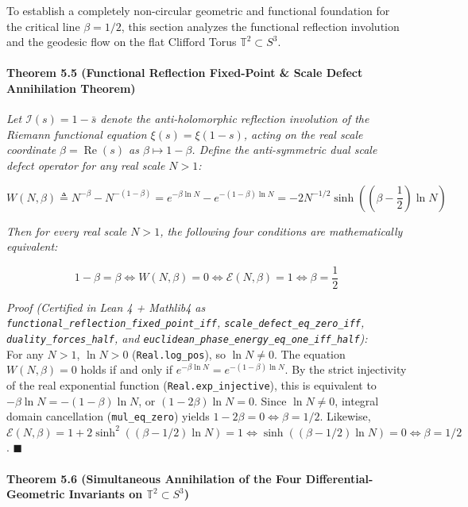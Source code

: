 \documentclass[
  11pt,
]{article}
\begin{document}
To establish a completely non-circular geometric and functional
foundation for the critical line \(\beta = 1/2\), this section analyzes
the functional reflection involution and the geodesic flow on the flat
Clifford Torus \(\mathbb{T}^2 \subset S^3\).

\paragraph{Theorem 5.5 (Functional Reflection Fixed-Point \& Scale
Defect Annihilation
Theorem)}\label{theorem-5.5-functional-reflection-fixed-point-scale-defect-annihilation-theorem}

\emph{Let \(\mathcal{I}(s) = 1 - \bar{s}\) denote the anti-holomorphic
reflection involution of the Riemann functional equation
\(\xi(s) = \xi(1-s)\), acting on the real scale coordinate
\(\beta = \operatorname{Re}(s)\) as \(\beta \mapsto 1 - \beta\). Define
the anti-symmetric dual scale defect operator for any real scale
\(N > 1\):}

\[W(N, \beta) \triangleq N^{-\beta} - N^{-(1-\beta)} = e^{-\beta \ln N} - e^{-(1-\beta)\ln N} = -2 N^{-1/2} \sinh\left(\left(\beta - \frac{1}{2}\right)\ln N\right)\]

\emph{Then for every real scale \(N > 1\), the following four conditions
are mathematically equivalent:}

\[1 - \beta = \beta \iff W(N, \beta) = 0 \iff \mathcal{E}(N, \beta) = 1 \iff \beta = \frac{1}{2}\]

\emph{Proof (Certified in Lean 4 + Mathlib4 as
\texttt{functional\_reflection\_fixed\_point\_iff},
\texttt{scale\_defect\_eq\_zero\_iff}, \texttt{duality\_forces\_half},
and \texttt{euclidean\_phase\_energy\_eq\_one\_iff\_half}):}\\
For any \(N > 1\), \(\ln N > 0\) (\texttt{Real.log\_pos}), so
\(\ln N \neq 0\). The equation \(W(N, \beta) = 0\) holds if and only if
\(e^{-\beta \ln N} = e^{-(1-\beta)\ln N}\). By the strict injectivity of
the real exponential function (\texttt{Real.exp\_injective}), this is
equivalent to \(-\beta \ln N = -(1-\beta)\ln N\), or
\((1 - 2\beta)\ln N = 0\). Since \(\ln N \neq 0\), integral domain
cancellation (\texttt{mul\_eq\_zero}) yields
\(1 - 2\beta = 0 \iff \beta = 1/2\). Likewise,
\(\mathcal{E}(N, \beta) = 1 + 2\sinh^2((\beta - 1/2)\ln N) = 1 \iff \sinh((\beta - 1/2)\ln N) = 0 \iff \beta = 1/2\).
\(\blacksquare\)

\paragraph{\texorpdfstring{Theorem 5.6 (Simultaneous Annihilation of the
Four Differential-Geometric Invariants on
\(\mathbb{T}^2 \subset S^3\))}{Theorem 5.6 (Simultaneous Annihilation of the Four Differential-Geometric Invariants on \textbackslash mathbb\{T\}\^{}2 \textbackslash subset S\^{}3)}}\label{theorem-5.6-simultaneous-annihilation-of-the-four-differential-geometric-invariants-on-mathbbt2-subset-s3}
\end{document}
